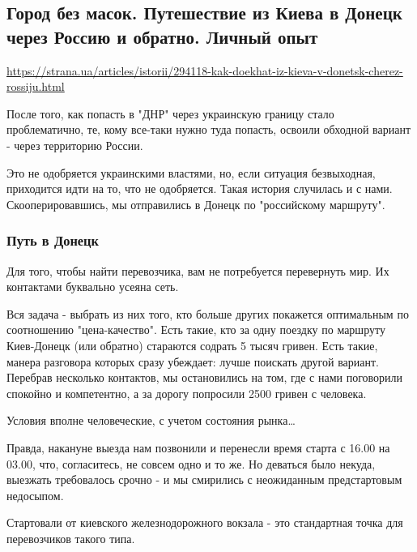  
 

\subsection{Город без масок. Путешествие из Киева в Донецк через Россию и обратно. Личный опыт }
\label{sec:11_10_2020.news.ua.strana_ua.1_dnr_trip}
\url{https://strana.ua/articles/istorii/294118-kak-doekhat-iz-kieva-v-donetsk-cherez-rossiju.html}

После того, как попасть в "ДНР" через украинскую границу стало проблематично,
те, кому все-таки нужно туда попасть, освоили обходной вариант - через
территорию России.

Это не одобряется украинскими властями, но, если ситуация безвыходная,
приходится идти на то, что не одобряется. Такая история случилась и с нами.
Скооперировавшись, мы отправились в Донецк по "российскому маршруту".

\subsubsection{Путь в Донецк}

Для того, чтобы найти перевозчика, вам не потребуется перевернуть мир. Их
контактами буквально усеяна сеть.

Вся задача - выбрать из них того, кто больше других покажется оптимальным по
соотношению "цена-качество". Есть такие, кто за одну поездку по маршруту
Киев-Донецк (или обратно) стараются содрать 5 тысяч гривен. Есть такие, манера
разговора которых сразу убеждает: лучше поискать другой вариант. Перебрав
несколько контактов, мы остановились на том, где с нами поговорили спокойно и
компетентно, а за дорогу попросили 2500 гривен с человека.

Условия вполне человеческие, с учетом состояния рынка…

Правда, накануне выезда нам позвонили и перенесли время старта с 16.00 на
03.00, что, согласитесь, не совсем одно и то же. Но деваться было некуда,
выезжать требовалось срочно - и мы смирились с неожиданным предстартовым
недосыпом.

Стартовали от киевского железнодорожного вокзала - это стандартная точка для
перевозчиков такого типа.

